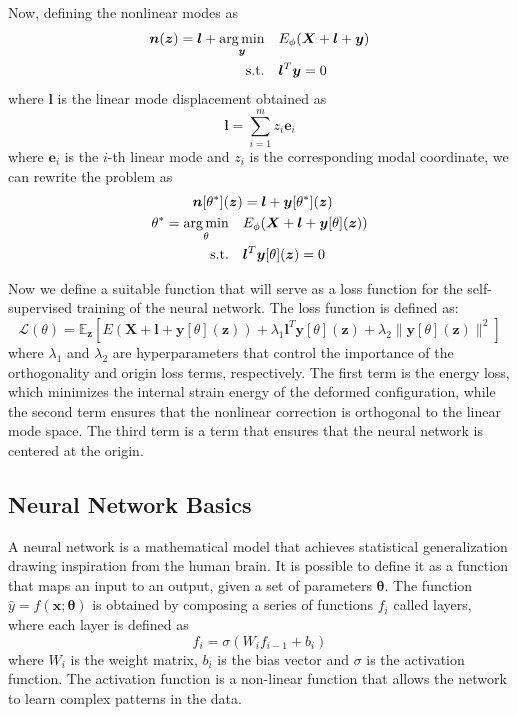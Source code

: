 Now, defining the nonlinear modes as 
\begin{align}
    \bm{n}(\bm{z}) = \bm{l} + \operatorname*{arg\,min}_{\bm{y}} \quad & E_\phi(\bm{X} + \bm{l} + \bm{y}) \\ 
    \text{s.t.} \quad & \bm{l}^T \bm{y} = 0
\end{align}
where \( \bm{l} \) is the linear mode displacement obtained as
\begin{equation}
    \bm{l} = \sum_{i=1}^m z_i \bm{e}_i
\end{equation}
where \( \bm{e}_i \) is the $i$-th linear mode and \( z_i \) is the corresponding modal coordinate, we can rewrite the problem as
\begin{align*}
    \bm{n}[\theta^*](\bm{z}) &= \bm{l} + \bm{y}[\theta^*](\bm{z}) \\
    \theta^* = \underset{\theta}{\operatorname*{arg\,min}} \quad & E_\phi(\bm{X} + \bm{l} + \bm{y}[\theta](\bm{z})) \\
    \text{s.t.} \quad & \bm{l}^T \bm{y}[\theta](\bm{z}) = 0
\end{align*}

Now we define a suitable function that will serve as a loss function for the self-supervised training of the neural network. The loss function is defined as:
\begin{equation}
    \mathcal{L}(\theta) = \mathbb{E}_{\bm{z}} \left[ E(\bm{X} + \bm{l} + \bm{y}[\theta](\bm{z})) + \lambda_1 \bm{l}^T \bm{y}[\theta](\bm{z}) + \lambda_2 \|\bm{y}[\theta](\bm{z})\|^2 \right]
\end{equation}
where \( \lambda_1 \) and \( \lambda_2 \) are hyperparameters that control the importance of the orthogonality and origin loss terms, respectively. The first term is the energy loss, which minimizes the internal strain energy of the deformed configuration, while the second term ensures that the nonlinear correction is orthogonal to the linear mode space. The third term is a term that ensures that the neural network is centered at the origin.





\subsection{Neural Network Basics}

A neural network is a mathematical model that achieves statistical generalization drawing inspiration from the human brain. It is possible to define it as a function that maps an input to an output, given a set of parameters \( \bm{\theta} \). The function \( \hat{y} = f(\bm{x}; \bm{\theta}) \) is obtained by composing a series of functions \( f_i \) called layers, where each layer is defined as
\begin{equation}
    f_i = \sigma(W_i f_{i-1} + b_i)
\end{equation}
where \( W_i \) is the weight matrix, \( b_i \) is the bias vector and \( \sigma \) is the activation function. The activation function is a non-linear function that allows the network to learn complex patterns in the data. 

